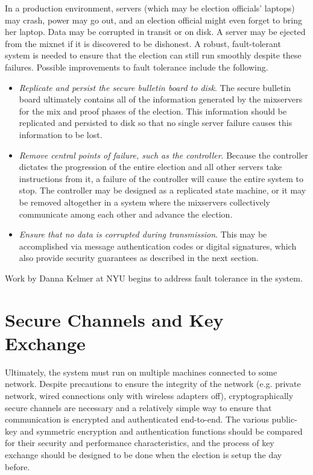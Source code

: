 In a production environment, servers (which may be election officials' laptops) may crash, power may go out, and an election official might even forget to bring her laptop. Data may be corrupted in transit or on disk. A server may be ejected from the mixnet if it is discovered to be dishonest. A robust, fault-tolerant system is needed to ensure that the election can still run smoothly despite these failures. Possible improvements to fault tolerance include the following.
\begin{itemize}
\item \emph{Replicate and persist the secure bulletin board to disk}. The secure bulletin board ultimately contains all of the information generated by the mixservers for the mix and proof phases of the election. This information should be replicated and persisted to disk so that no single server failure causes this information to be lost.
\item \emph{Remove central points of failure, such as the controller}. Because the controller dictates the progression of the entire election and all other servers take instructions from it, a failure of the controller will cause the entire system to stop. The controller may be designed as a replicated state machine, or it may be removed altogether in a system where the mixservers collectively communicate among each other and advance the election.
\item \emph{Ensure that no data is corrupted during transmission}. This may be accomplished via message authentication codes or digital signatures, which also provide security guarantees as described in the next section.
\end{itemize}
Work by Danna Kelmer at NYU begins to address fault tolerance in the system.

\section{Secure Channels and Key Exchange}

Ultimately, the system must run on multiple machines connected to some network. Despite precautions to ensure the integrity of the network (e.g. private network, wired connections only with wireless adapters off), cryptographically secure channels are necessary and a relatively simple way to ensure that communication is encrypted and authenticated end-to-end. The various public-key and symmetric encryption and authentication functions should be compared for their security and performance characteristics, and the process of key exchange should be designed to be done when the election is setup the day before.
